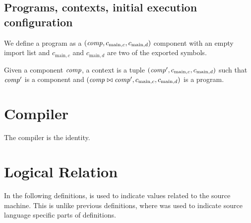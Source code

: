 \documentclass[a4paper]{article}
\begin{document}
\subsection{Programs, contexts, initial execution configuration}
\label{sec:programs}

\begin{definition}
  We define a program as a $(\var{comp}, c_{\mathrm{main},c}, c_{\mathrm{main},d})$ component with an empty import list and $c_{\mathrm{main},c}$ and $c_{\mathrm{main},d}$ are two of the exported symbols.

  Given a component $\var{comp}$, a context is a tuple $(\var{comp'}, c_{\mathrm{main},c}, c_{\mathrm{main},d})$ such that $\var{comp'}$ is a component and $(\var{comp} \bowtie \var{comp'}, c_{\mathrm{main},c}, c_{\mathrm{main},d})$ is a program.
\end{definition}

\begin{definition}
  \begin{mathpar}
  \end{mathpar}
\end{definition}

\section{Compiler}
\label{sec:compiler}

The compiler is the identity.

\section{Logical Relation}
In the following definitions,  is used to indicate values related to the source machine. This is unlike previous definitions, where  was used to indicate source language specific parts of definitions.
\end{document}
